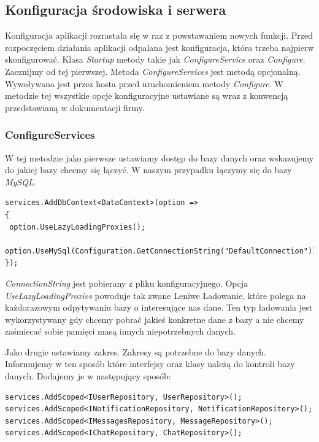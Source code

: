 \documentclass[12pt,a4paper]{article}
\begin{document}
\subsection{Konfiguracja środowiska i serwera}

\hspace*{0.7cm} Konfiguracja aplikacji rozrastała się w raz z powstawaniem nowych funkcji. Przed rozpoczęciem działania aplikacji odpalana jest konfiguracja, która trzeba najpierw skonfigurować. Klasa \textit{Startup} metody takie jak \textit{ConfigureService} oraz \textit{Configure}. Zacznijmy od tej pierwszej. Metoda \textit{ConfigureServices} jest metodą opcjonalną. Wywoływana jest przez hosta przed uruchomieniem metody \textit{Configure}. W metodzie tej wszystkie opcje konfiguracyjne ustawiane są wraz z konwencją przedstawianą w dokumentacji firmy.

\subsubsection{ConfigureServices}

\hspace*{0.7cm} W tej metodzie jako pierwsze ustawiamy dostęp do bazy danych oraz wskazujemy do jakiej bazy chcemy się łączyć. W naszym przypadku łączymy się do bazy \textit{MySQL}.

\begin{lstlisting}[caption={Dodanie bazy danych do konfiguracji}]
services.AddDbContext<DataContext>(option => 
{
 option.UseLazyLoadingProxies();
 option.UseMySql(Configuration.GetConnectionString("DefaultConnection"));
});
\end{lstlisting}

\hspace*{0.7cm} \textit{ConnectionString} jest pobierany z pliku konfiguracyjnego. Opcja \textit{UseLazyLoadingProxies} powoduje tak zwane Leniwe Ładowanie, które polega na każdorazowym odpytywaniu bazy o interesujące nas dane. Ten typ ładowania jest wykorzystywany gdy chcemy pobrać jakieś konkretne dane z bazy a nie chcemy zaśmiecać sobie pamięci masą innych niepotrzebnych danych.\newline

\hspace*{0.7cm} Jako drugie ustawiamy zakres. Zakresy są potrzebne do bazy danych. Informujemy w ten sposób które interfejsy oraz klasy należą do kontroli bazy danych. Dodajemy je w następujący sposób:

\begin{lstlisting}[caption={Dodanie klas Repository}]
services.AddScoped<IUserRepository, UserRepository>();
services.AddScoped<INotificationRepository, NotificationRepository>();
services.AddScoped<IMessagesRepository, MessageRepository>();
services.AddScoped<IChatRepository, ChatRepository>();
\end{lstlisting}
\end{document}
